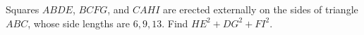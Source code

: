 Squares $ABDE$, $BCFG$, and $CAHI$ are erected externally on the sides of triangle $ABC$, whose side lengths are $6,9,13$. Find $HE^2+DG^2+FI^2$.
